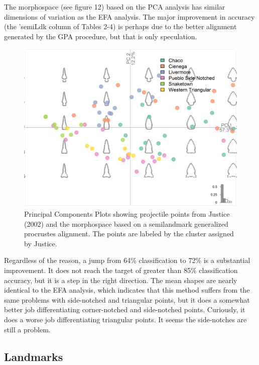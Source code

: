 \documentclass[a4paper]{article}
\begin{document}
The morphospace (see figure 12) based on the PCA analysis has similar dimensions of variation as the EFA analysis. The major improvement in accuracy (the 'semiLdk column of Tables 2-4) is perhaps due to the better alignment generated by the GPA procedure, but that is only speculation.

\begin{figure}
\includegraphics[width=1\linewidth]{figures/JusticeSLDKPCA} \caption{Principal Components Plots showing projectile points from Justice (2002) and the morphospace based on a semilandmark generalized procrustes alignment. The points are labeled by the cluster assigned by Justice.}\label{fig:JusticeSLDKPCA}
\end{figure}

Regardless of the reason, a jump from 64\% classification to 72\% is a substantial improvement. It does not reach the target of greater than 85\% classification accuracy, but it is a step in the right direction. The mean shapes are nearly identical to the EFA analysis, which indicates that this method suffers from the same problems with side-notched and triangular points, but it does a somewhat better job differentiating corner-notched and side-notched points. Curiously, it does a worse job differentiating triangular points. It seems the side-notches are still a problem.

\hypertarget{landmarks}{%
\subsection*{Landmarks}\label{landmarks}}
\end{document}
